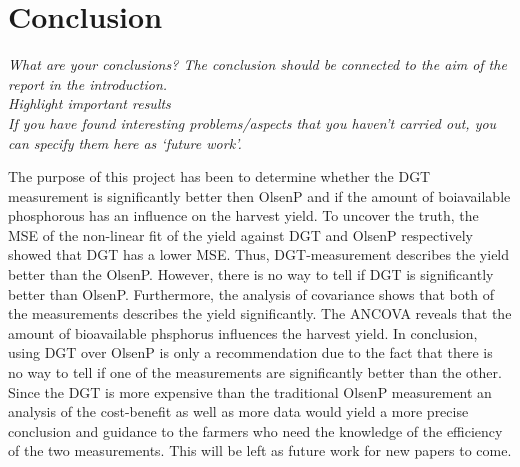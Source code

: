 \documentclass[11pt, fleqn, titlepage]{article}
\begin{document}
\section{Conclusion}
\textit{What are your conclusions? The conclusion should be connected to the aim of the report in the introduction. \\ Highlight important results \\ If you have found interesting problems/aspects that you haven’t carried out, you can specify them here as ‘future work’.}

The purpose of this project has been to determine whether the DGT measurement is significantly better then OlsenP and if the amount of boiavailable phosphorous has an influence on the harvest yield. To uncover the truth, the MSE of the non-linear fit of the yield against DGT and OlsenP respectively showed that DGT has a lower MSE. Thus, DGT-measurement describes the yield better than the OlsenP. However, there is no way to tell if DGT is significantly better than OlsenP. Furthermore, the analysis of covariance shows that both of the measurements describes the yield significantly. The ANCOVA reveals that the amount of bioavailable phsphorus influences the harvest yield. In conclusion, using DGT over OlsenP is only a recommendation due to the fact that there is no way to tell if one of the measurements are significantly better than the other. Since the DGT is more expensive than the traditional OlsenP measurement an analysis of the cost-benefit as well as more data would yield a more precise conclusion and guidance to the farmers who need the knowledge of the efficiency of the two measurements. This will be left as future work for new papers to come.



\end{document}
